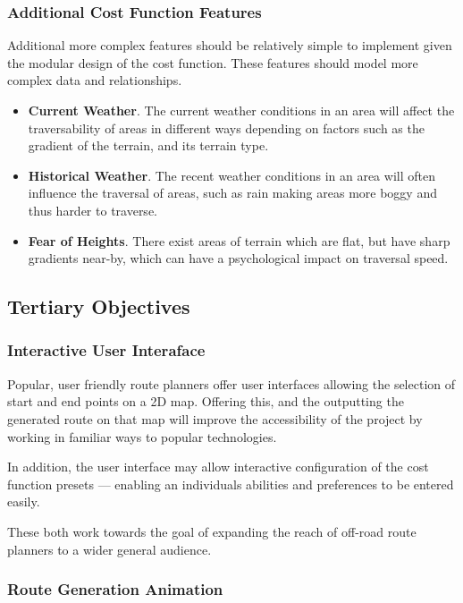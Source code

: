 \documentclass[12pt]{article}
\begin{document}
\subsubsection{Additional Cost Function Features}

Additional more complex features should be relatively simple to implement given the modular design of the cost function. These features should model more complex data and relationships.

\begin{itemize}
  \item \textbf{Current Weather}. The current weather conditions in an area will affect the traversability of areas in different ways depending on factors such as the gradient of the terrain, and its terrain type.
  \item \textbf{Historical Weather}. The recent weather conditions in an area will often influence the traversal of areas, such as rain making areas more boggy and thus harder to traverse.
  \item \textbf{Fear of Heights}. There exist areas of terrain which are flat, but have sharp gradients near-by, which can have a psychological impact on traversal speed.
\end{itemize}

\subsection{Tertiary Objectives}

\subsubsection{Interactive User Interaface}

Popular, user friendly route planners offer user interfaces allowing the selection of start and end points on a 2D map. Offering this, and the outputting the generated route on that map will improve the accessibility of the project by working in familiar ways to popular technologies.

In addition, the user interface may allow interactive configuration of the cost function presets --- enabling an individuals abilities and preferences to be entered easily.

These both work towards the goal of expanding the reach of off-road route planners to a wider general audience.

\subsubsection{Route Generation Animation}
\end{document}
